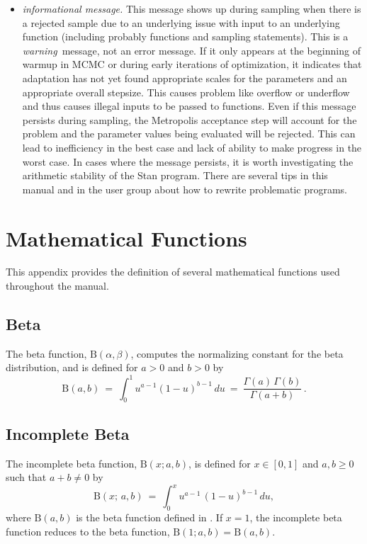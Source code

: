 \begin{itemize}
\item {\it informational message.}  This message shows up during
  sampling when there is a rejected sample due to an underlying issue
  with input to an underlying function (including probably functions
  and sampling statements).  This is a {\it warning}\, message, not an
  error message.  If it only appears at the beginning of warmup in
  MCMC or during early iterations of optimization, it indicates that
  adaptation has not yet found appropriate scales for the parameters
  and an appropriate overall stepsize.  This causes problem like
  overflow or underflow and thus causes illegal inputs to be passed to
  functions.  Even if this message persists during sampling, the
  Metropolis acceptance step will account for the problem and the
  parameter values being evaluated will be rejected.  This can lead to
  inefficiency in the best case and lack of ability to make progress
  in the worst case.  In cases where the message persists, it is worth
  investigating the arithmetic stability of the Stan program.  There
  are several tips in this manual and in the user group about how to
  rewrite problematic programs.
\end{itemize}




\chapter{Mathematical Functions}\label{math-functions.appendix}

This appendix provides the definition of several mathematical
functions used throughout the manual.

\section{Beta}\label{beta-appendix.section}

The beta function, $\mbox{B}(\alpha,\beta)$, computes the normalizing
constant for the beta distribution, and is defined for $a > 0$ and $b
> 0$ by
%
\[
\mbox{B}(a,b)
\ = \
\int_0^1 u^{a - 1} (1 - u)^{b - 1} \, du
\ = \
\frac{\Gamma(a) \, \Gamma(b)}{\Gamma(a+b)} \, .
\]

\section{Incomplete Beta}\label{inc-beta-appendix.section}

The incomplete beta function, $\mathrm{B}(x; a, b)$, is defined for 
$x \in [0, 1]$ and $a, b \geq 0$ such that $a + b \neq 0$ by
\[
\mathrm{B}(x; \, a, b) 
\ = \
\int_0^x u^{a -  1} \, (1 - u)^{b - 1} \, du,
\]
%
where $\mathrm{B}(a, b)$ is the beta function defined in
.  If $x = 1$, the incomplete beta function
reduces to the beta function, $\mathrm{B}(1; a, b) = \mathrm{B}(a,
b)$.

